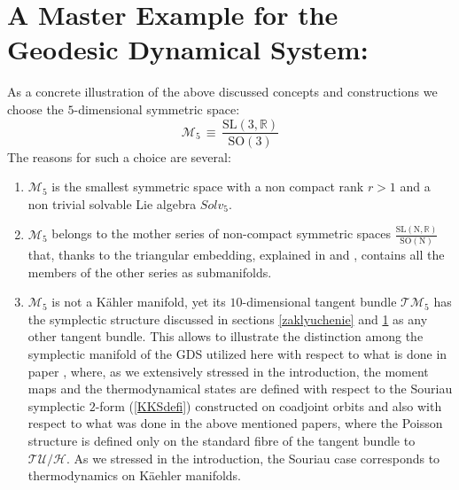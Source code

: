 \documentclass[10pt,a4paper]{article}
\begin{document}
\section{A Master Example for the Geodesic Dynamical System:    }
\label{magister}
As a concrete illustration of the above discussed concepts and
constructions we choose the $5$-dimensional symmetric space:
\begin{equation}\label{masterexamp}
  \mathcal{M}_{5} \, \equiv \, \frac{\mathrm{SL(3,\mathbb{R})}}{\mathrm{SO(3)}}
\end{equation}
The reasons for such a choice are several:
\begin{enumerate}
  \item $\mathcal{M}_{5}$  is the smallest symmetric space with a non compact rank $r>1$ and a non trivial solvable Lie algebra $Solv_5$.
  \item $\mathcal{M}_{5}$ belongs to the mother series of non-compact symmetric spaces $\frac{\mathrm{SL(N,\mathbb{R})}}{\mathrm{SO(N)}}$ that, thanks to the triangular embedding, explained in \cite{pgtstheory} and \cite{TSnaviga}, contains all the members of the other series as submanifolds.
  \item $\mathcal{M}_{5}$ is not a K\"ahler manifold, yet its $10$-dimensional tangent bundle $\mathcal{TM}_{5}$ has the symplectic structure discussed in sections \ref{zaklyuchenie} and \ref{magister} as any other tangent bundle. This allows to illustrate  the distinction among the symplectic manifold of the GDS utilized here  with respect to what is done in paper \cite{barbaresco2}, where, as we extensively stressed in the introduction, the moment maps and the thermodynamical states  are defined with respect to the Souriau symplectic $2$-form (\ref{KKSdefi}) constructed on coadjoint orbits and also with respect to what was done in the above mentioned papers\cite{sashaebog,arcangelo},  where the Poisson structure is defined only on the standard fibre of the tangent bundle to $\mathcal{TU}/\mathcal{H}$.  As we stressed in the introduction, the Souriau case corresponds to thermodynamics on K\"aehler manifolds.
\end{enumerate}
\end{document}
